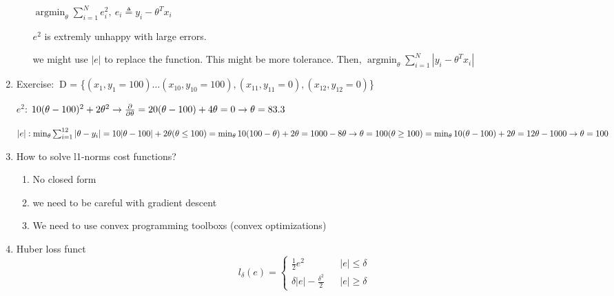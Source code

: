 \documentclass[12pt]{article}
\newcommand{\exe}{{\color{green} Exercise: $\ $}}
\DeclareMathOperator*{\argmin}{\arg\min}
\begin{document}
\begin{enumerate}
\begin{enumerate}
                $\argmin_{\theta} \sum_{i = 1}^{N} e_i^2, \ e_i \triangleq y_i - \theta^T x_i$

                $e^2$ is extremly unhappy with large errors.

                we might use $|e|$ to replace the function. This might be more tolerance. Then, $\argmin_{\theta} \sum_{i = 1}^N |y_i - \theta^T x_i|$
            \end{enumerate}
            
            \item \exe D = \{$(x_1, y_1 = 100) \dots (x_10, y_10 = 100), (x_{11}, y_{11} = 0),  (x_{12}, y_{12} = 0)$\}
            
            $e^2$: $10(\theta - 100)^2 + 2\theta^2 \rightarrow \\ \frac{\partial}{\partial \theta} = 20(\theta - 100) + 4\theta = 0 \rightarrow \\ \theta = 83.3$

            $|e|: \min_{\theta} \sum_{i = 1}^{12} |\theta - y_i|  = 10| \theta - 100 | + 2\theta \\
             (\theta \le 100) = \min_{\theta} 10(100 - \theta) + 2\theta \\
             = 1000 - 8\theta \rightarrow \theta = 100\\
             (\theta \ge 100) = \min_{\theta} 10(\theta - 100) + 2\theta \\
             = 12\theta - 1000 \rightarrow \theta = 100 $
            
             \item How to solve l1-norms cost functions?
             
             \begin{enumerate}
                 \item No closed form
                 \item we need to be careful with gradient descent
                 \item We need to use convex programming toolboxs (convex optimizations)
             \end{enumerate}

             \item Huber loss funct
             $$
                l_{\delta} (e) = \left\{ 
                    \begin{array}{rcl}
                        \frac{1}{2}e^2 & & |e| \le \delta \\
                        \delta |e| - \frac{{\delta}^2}{2} & & |e| \ge \delta
                    \end{array} 
                    \right.
             $$


\end{enumerate}
\end{document}
